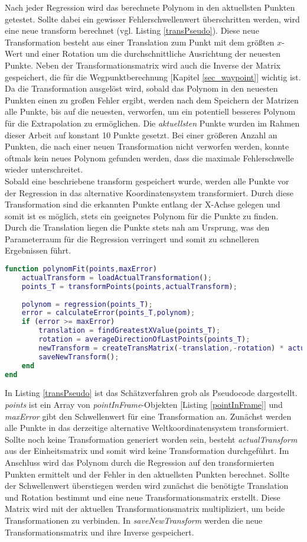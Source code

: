 Nach jeder Regression wird das berechnete Polynom in den aktuellsten Punkten getestet. Sollte dabei ein gewisser Fehlerschwellenwert überschritten werden, wird eine neue \gls{transform} berechnet (vgl. Listing \ref{transPseudo}). Diese neue Transformation besteht aus einer Translation zum Punkt mit dem größten $x$-Wert und einer Rotation um die durchschnittliche Ausrichtung der neuesten Punkte. Neben der Transformationsmatrix wird auch die Inverse der Matrix gespeichert, die für die Wegpunktberechnung [Kapitel \ref{sec_waypoint}] wichtig ist. Da die Transformation ausgelöst wird, sobald das Polynom in den neuesten Punkten einen zu großen Fehler ergibt, werden nach dem Speichern der Matrizen alle Punkte, bis auf die neuesten, verworfen, um ein potentiell besseres Polynom für die Extrapolation zu ermöglichen. Die \textit{aktuellsten} Punkte wurden im Rahmen dieser Arbeit auf konstant 10 Punkte gesetzt. Bei einer größeren Anzahl an Punkten, die nach einer neuen Transformation nicht verworfen werden, konnte oftmals kein neues Polynom gefunden werden, dass die maximale Fehlerschwelle wieder unterschreitet.\\
Sobald eine beschriebene \gls{transform} gespeichert wurde, werden alle Punkte vor der Regression in das alternative Koordinatensystem transformiert. Durch diese Transformation sind die erkannten Punkte entlang der X-Achse gelegen und somit ist es möglich, stets ein geeignetes Polynom für die Punkte zu finden. Durch die Translation liegen die Punkte stets nah am Ursprung, was den Parameterraum für die Regression verringert und somit zu schnelleren Ergebnissen führt.\label{alterWorldCoords}
\begin{lstlisting}[language=Matlab,caption=Pseudocode des Schätzverfahrens,label=transPseudo]
function polynomFit(points,maxError)
	actualTransform = loadActualTransformation();
	points_T = transformPoints(points,actualTransform);
	
	polynom = regression(points_T);
	error = calculateError(points_T,polynom);
	if (error >= maxError)
		translation = findGreatestXValue(points_T);
		rotation = averageDirectionOfLastPoints(points_T);
		newTransform = createTransMatrix(-translation,-rotation) * actualTransform;
		saveNewTransform();
	end
end
\end{lstlisting}
In Listing \ref{transPseudo} ist das Schätzverfahren grob als Pseudocode dargestellt. \textit{points} ist ein Array von \textit{pointInFrame}-Objekten [Listing \ref{pointInFrame}] und \textit{maxError} gibt den Schwellenwert für eine Transformation an. Zunächst werden alle Punkte in das derzeitige alternative Weltkoordinatensystem transformiert. Sollte noch keine Transformation generiert worden sein, besteht \textit{actualTransform} aus der Einheitsmatrix und somit wird keine Transformation durchgeführt. Im Anschluss wird das Polynom durch die Regression auf den transformierten Punkten ermittelt und der Fehler in den aktuellsten Punkten berechnet. Sollte der Schwellenwert überstiegen werden wird zunächst die benötigte Translation und Rotation bestimmt und eine neue Transformationsmatrix erstellt. Diese Matrix wird mit der aktuellen Transformationsmatrix multipliziert, um beide Transformationen zu verbinden. In \textit{saveNewTransform} werden die neue Transformationsmatrix und ihre Inverse gespeichert.



